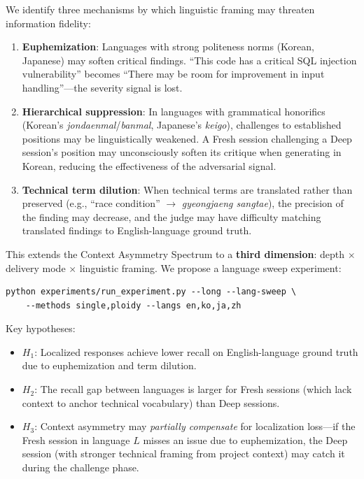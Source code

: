 \documentclass[11pt]{article}
\begin{document}
We identify three mechanisms by which linguistic framing may threaten information fidelity:

\begin{enumerate}[label=\arabic*., leftmargin=1.5em]
  \item \textbf{Euphemization}: Languages with strong politeness norms (Korean, Japanese) may soften critical findings. ``This code has a critical SQL injection vulnerability'' becomes ``There may be room for improvement in input handling''---the severity signal is lost.
  \item \textbf{Hierarchical suppression}: In languages with grammatical honorifics (Korean's \emph{jondaenmal}/\emph{banmal}, Japanese's \emph{keigo}), challenges to established positions may be linguistically weakened. A Fresh session challenging a Deep session's position may unconsciously soften its critique when generating in Korean, reducing the effectiveness of the adversarial signal.
  \item \textbf{Technical term dilution}: When technical terms are translated rather than preserved (e.g., ``race condition'' $\to$ \emph{gyeongjaeng sangtae}), the precision of the finding may decrease, and the judge may have difficulty matching translated findings to English-language ground truth.
\end{enumerate}

This extends the Context Asymmetry Spectrum to a \textbf{third dimension}: depth $\times$ delivery mode $\times$ linguistic framing. We propose a language sweep experiment:

\begin{lstlisting}
python experiments/run_experiment.py --long --lang-sweep \
    --methods single,ploidy --langs en,ko,ja,zh
\end{lstlisting}

Key hypotheses:
\begin{itemize}[leftmargin=1.5em]
  \item $H_1$: Localized responses achieve lower recall on English-language ground truth due to euphemization and term dilution.
  \item $H_2$: The recall gap between languages is larger for Fresh sessions (which lack context to anchor technical vocabulary) than Deep sessions.
  \item $H_3$: Context asymmetry may \emph{partially compensate} for localization loss---if the Fresh session in language $L$ misses an issue due to euphemization, the Deep session (with stronger technical framing from project context) may catch it during the challenge phase.
\end{itemize}
\end{document}
